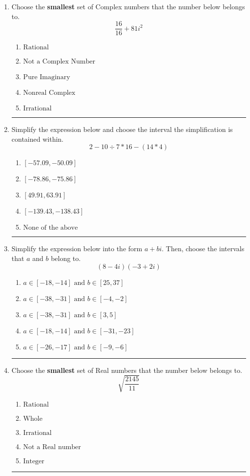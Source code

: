 \documentclass[14pt]{extbook}
\newcommand{\litem}[1]{\item#1\hspace*{-1cm}\rule{\textwidth}{0.4pt}}
\begin{document}
\begin{enumerate}
{\begin{enumerate}[label=\Alph*.]
\end{enumerate} }
\litem{
Choose the \textbf{smallest} set of Complex numbers that the number below belongs to.\[ \frac{16}{16}+81i^2 \]\begin{enumerate}[label=\Alph*.]
\item \( \text{Rational} \)
\item \( \text{Not a Complex Number} \)
\item \( \text{Pure Imaginary} \)
\item \( \text{Nonreal Complex} \)
\item \( \text{Irrational} \)

\end{enumerate} }
\litem{
Simplify the expression below and choose the interval the simplification is contained within.\[ 2 - 10 \div 7 * 16 - (14 * 4) \]\begin{enumerate}[label=\Alph*.]
\item \( [-57.09, -50.09] \)
\item \( [-78.86, -75.86] \)
\item \( [49.91, 63.91] \)
\item \( [-139.43, -138.43] \)
\item \( \text{None of the above} \)

\end{enumerate} }
\litem{
Simplify the expression below into the form $a+bi$. Then, choose the intervals that $a$ and $b$ belong to.\[ (8 - 4 i)(-3 + 2 i) \]\begin{enumerate}[label=\Alph*.]
\item \( a \in [-18, -14] \text{ and } b \in [25, 37] \)
\item \( a \in [-38, -31] \text{ and } b \in [-4, -2] \)
\item \( a \in [-38, -31] \text{ and } b \in [3, 5] \)
\item \( a \in [-18, -14] \text{ and } b \in [-31, -23] \)
\item \( a \in [-26, -17] \text{ and } b \in [-9, -6] \)

\end{enumerate} }
\litem{
Choose the \textbf{smallest} set of Real numbers that the number below belongs to.\[ \sqrt{\frac{2145}{11}} \]\begin{enumerate}[label=\Alph*.]
\item \( \text{Rational} \)
\item \( \text{Whole} \)
\item \( \text{Irrational} \)
\item \( \text{Not a Real number} \)
\item \( \text{Integer} \)


\end{enumerate}}
\end{enumerate}
\end{document}
